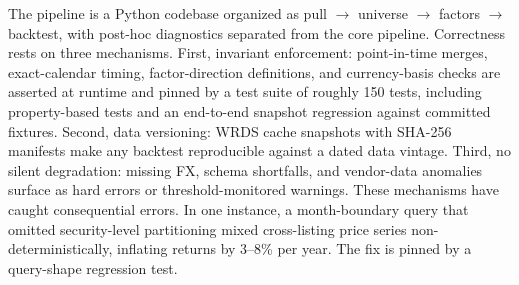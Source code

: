 \documentclass[11pt,a4paper]{article}
\begin{document}
The pipeline is a Python codebase organized as pull $\to$ universe $\to$
factors $\to$ backtest, with post-hoc diagnostics separated from the core
pipeline. Correctness rests on three mechanisms. First, invariant
enforcement: point-in-time merges, exact-calendar timing, factor-direction
definitions, and currency-basis checks are asserted at runtime and pinned by
a test suite of roughly 150 tests, including property-based tests and an
end-to-end snapshot regression against committed fixtures. Second,
data versioning: WRDS cache snapshots with SHA-256 manifests make any
backtest reproducible against a dated data vintage. Third, no silent
degradation: missing FX, schema shortfalls, and vendor-data anomalies
surface as hard errors or threshold-monitored warnings. These mechanisms have
caught consequential errors. In one instance, a month-boundary query that
omitted security-level partitioning mixed cross-listing price series
non-deterministically, inflating returns by 3--8\% per year. The fix is
pinned by a query-shape regression test.
\end{document}
